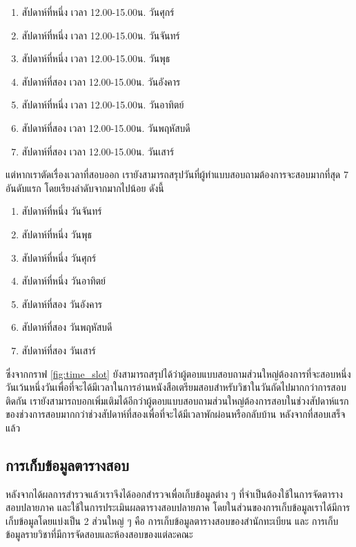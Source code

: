 \begin{enumerate}
  \item สัปดาห์ที่หนึ่ง เวลา 12.00-15.00น. วันศุกร์ 
  \item สัปดาห์ที่หนึ่ง เวลา 12.00-15.00น. วันจันทร์
  \item สัปดาห์ที่หนึ่ง เวลา 12.00-15.00น. วันพุธ
  \item สัปดาห์ที่สอง เวลา 12.00-15.00น. วันอังคาร
  \item สัปดาห์ที่หนึ่ง เวลา 12.00-15.00น. วันอาทิตย์
  \item สัปดาห์ที่สอง เวลา 12.00-15.00น. วันพฤหัสบดี
  \item สัปดาห์ที่สอง เวลา 12.00-15.00น. วันเสาร์
\end{enumerate}

แต่หากเราตัดเรื่องเวลาที่สอบออก เรายังสามารถสรุปวันที่ผู้ทำแบบสอบถามต้องการจะสอบมากที่สุด 7 อันดับแรก โดยเรียงลำดับจากมากไปน้อย ดังนี้
\begin{enumerate}
  \item สัปดาห์ที่หนึ่ง วันจันทร์
  \item สัปดาห์ที่หนึ่ง วันพุธ
  \item สัปดาห์ที่หนึ่ง วันศุกร์ 
  \item สัปดาห์ที่หนึ่ง วันอาทิตย์
  \item สัปดาห์ที่สอง วันอังคาร
  \item สัปดาห์ที่สอง วันพฤหัสบดี
  \item สัปดาห์ที่สอง วันเสาร์
\end{enumerate}
ซึ่งจากกราฟ \ref{fig:time_slot} ยังสามารถสรุปได้ว่าผู้ตอบแบบสอบถามส่วนใหญ่ต้องการที่จะสอบหนึ่งวันเว้นหนึ่งวันเพื่อที่จะได้มีเวลาในการอ่านหนังสือเตรียมสอบสำหรับวิชาในวันถัดไปมากกว่าการสอบติดกัน 
เรายังสามารถบอกเพิ่มเติมได้อีกว่าผู้ตอบแบบสอบถามส่วนใหญ่ต้องการสอบในช่วงสัปดาห์แรกของช่วงการสอบมากกว่าช่วงสัปดาห์ที่สองเพื่อที่จะได้มีเวลาพักผ่อนหรือกลับบ้าน หลังจากที่สอบเสร็จแล้ว

\subsection{การเก็บข้อมูลตารางสอบ}
หลังจากได้ผลการสำรวจแล้วเราจึงได้ออกสำรวจเพื่อเก็บข้อมูลต่าง ๆ ที่จำเป็นต้องใช้ในการจัดตารางสอบปลายภาค และใช้ในการประเมินผลตารางสอบปลายภาค 
โดยในส่วนของการเก็บข้อมูลเราได้มีการเก็บข้อมูลโดยแบ่งเป็น 2 ส่วนใหญ่ ๆ คือ การเก็บข้อมูลตารางสอบของสำนักทะเบียน และ การเก็บข้อมูลรายวิชาที่มีการจัดสอบและห้องสอบของแต่ละคณะ


